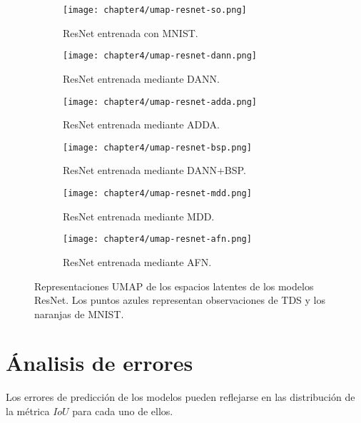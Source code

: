 \begin{figure}[H]
    \centering
    \begin{subfigure}[h]{0.40\textwidth}
        \texttt{[image: chapter4/umap-resnet-so.png]}
        \caption{ResNet entrenada con MNIST.}
        \label{fig:umap-resnet-so}
    \end{subfigure}
    \hfill
    \begin{subfigure}[h]{0.40\textwidth}
        \texttt{[image: chapter4/umap-resnet-dann.png]}
        \caption{ResNet entrenada mediante DANN.}
        \label{fig:umap-resnet-dann}
    \end{subfigure}
    \hfill
    \begin{subfigure}[h]{0.40\textwidth}
        \texttt{[image: chapter4/umap-resnet-adda.png]}
        \caption{ResNet entrenada mediante ADDA.}
        \label{fig:umap-resnet-adda}
    \end{subfigure}
    \hfill
    \begin{subfigure}[h]{0.40\textwidth}
        \texttt{[image: chapter4/umap-resnet-bsp.png]}
        \caption{ResNet entrenada mediante DANN+BSP.}
        \label{fig:umap-resnet-bsp}
    \end{subfigure}
    \hfill
    \begin{subfigure}[h]{0.40\textwidth}
        \texttt{[image: chapter4/umap-resnet-mdd.png]}
        \caption{ResNet entrenada mediante MDD.}
        \label{fig:umap-resnet-mdd}
    \end{subfigure}
    \hfill
    \begin{subfigure}[h]{0.40\textwidth}
        \texttt{[image: chapter4/umap-resnet-afn.png]}
        \caption{ResNet entrenada mediante AFN.}
        \label{fig:umap-resnet-afn}
    \end{subfigure}

    \caption{Representaciones UMAP de los espacios latentes de los modelos ResNet. Los puntos azules representan observaciones de TDS y los naranjas de MNIST.}
    \label{fig:umaps-renet}
\end{figure}

\section{\'Analisis de errores}

Los errores de predicci\'on de los modelos pueden reflejarse en las distribuci\'on de la m\'etrica $IoU$ para cada uno
de ellos.

